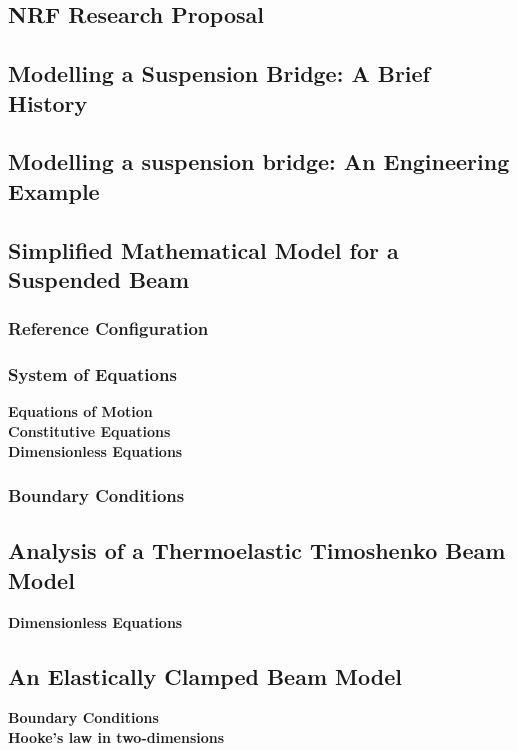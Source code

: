 \documentclass[../main.tex]{subfiles}
\begin{document}
\subsection{NRF Research Proposal}
\subsection{Modelling a Suspension Bridge: A Brief History}
\subsection{Modelling a suspension bridge: An Engineering Example}
\subsection{Simplified Mathematical Model for a Suspended Beam}
\subsubsection{Reference Configuration}
\subsubsection{System of Equations}
\textbf{Equations of Motion}\\
\textbf{Constitutive Equations}\\
\textbf{Dimensionless Equations}
\subsubsection{Boundary Conditions}
\subsection{Analysis of a Thermoelastic Timoshenko Beam Model}
\textbf{Dimensionless Equations}
\subsection{An Elastically Clamped Beam Model}
\textbf{Boundary Conditions}\\
\textbf{Hooke's law in two-dimensions}
\end{document}
